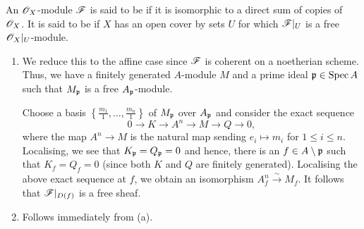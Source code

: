 \begin{definition}
    An $\mathscr{O}_X$-module $\mathscr{F}$ is said to be  if it is isomorphic to a direct sum of copies of $\mathscr{O}_X$. It is said to be  if $X$ has an open cover by sets $U$ for which $\mathscr{F}|_U$ is a free $\mathscr{O}_X|_U$-module.
\end{definition}

\setcounter{exercise}{6}
\begin{exercise} \hfill %
\begin{enumerate}[label=(\alph*)]
\item We reduce this to the affine case since $\mathscr{F}$ is coherent on a noetherian scheme. Thus, we have a finitely generated $A$-module $M$ and a prime ideal $\mathfrak{p}\in\operatorname{Spec} A$ such that $M_{\mathfrak{p}}$ is a free $A_{\mathfrak{p}}$-module. 

Choose a basis $\left\{\frac{m_1}{1},\dots,\frac{m_n}{1}\right\}$ of $M_{\mathfrak{p}}$ over $A_{\mathfrak{p}}$ and consider the exact sequence 
\begin{equation*}
    0\to K\to A^n\to M\to Q\to 0,
\end{equation*}
where the map $A^n\to M$ is the natural map sending $e_i\mapsto m_i$ for $1\le i\le n$. Localising, we see that $K_{\mathfrak{p}} = Q_{\mathfrak{p}} = 0$ and hence, there is an $f\in A\setminus\mathfrak{p}$ such that $K_f = Q_f = 0$ (since both $K$ and $Q$ are finitely generated). Localising the above exact sequence at $f$, we obtain an isomorphism $A^n_f\xrightarrow{\sim} M_f$. It follows that $\mathscr{F}|_{D(f)}$ is a free sheaf.

\item Follows immediately from (a). 


\end{enumerate}
\end{exercise}

